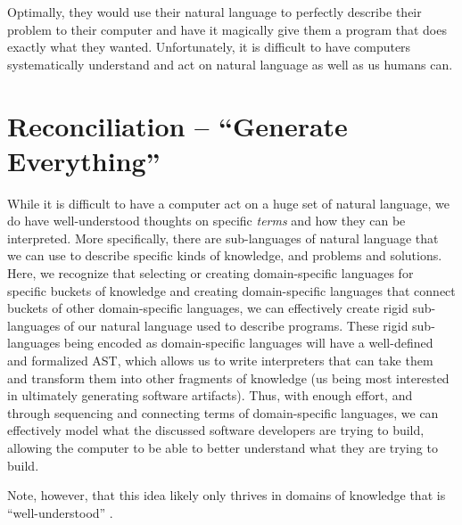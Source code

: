 Optimally, they would use their natural language to perfectly describe their
problem to their computer and have it magically give them a program that does
exactly what they wanted. Unfortunately, it is difficult to have computers
systematically understand and act on natural language as well as us humans can.

\section{Reconciliation -- ``Generate Everything''}

While it is difficult to have a computer act on a huge set of natural language,
we do have well-understood thoughts on specific \textit{terms} and how they can
be interpreted. More specifically, there are sub-languages of natural language
that we can use to describe specific kinds of knowledge, and problems and
solutions. Here, we recognize that selecting or creating domain-specific
languages for specific buckets of knowledge and creating domain-specific
languages that connect buckets of other domain-specific languages, we can
effectively create rigid sub-languages of our natural language used to describe
programs. These rigid sub-languages being encoded as domain-specific languages
will have a well-defined and formalized AST, which allows us
to write interpreters that can take them and transform them into other fragments
of knowledge (us being most interested in ultimately generating software
artifacts). Thus, with enough effort, and through sequencing and connecting
terms of domain-specific languages, we can effectively model what the discussed
software developers are trying to build, allowing the computer to be able to
better understand what they are trying to build. 

Note, however, that this idea likely only thrives in domains of knowledge that
is ``well-understood'' \cite{well-understood}.


